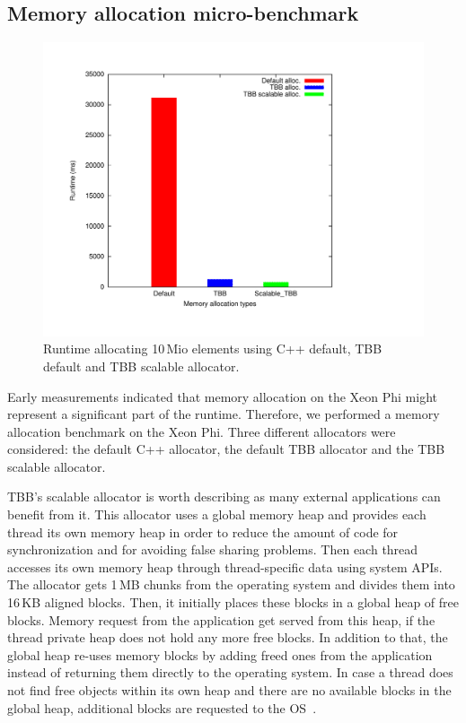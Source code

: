 \subsection{Memory allocation micro-benchmark}
\begin{figure}[t]
	\centering
	\includegraphics[scale=0.3]{../plots/mem_alloc/mem_alloc.pdf}
	\caption{Runtime allocating 10\,Mio elements using C++ default, TBB default and TBB scalable allocator.}
	\label{fig:mem_alloc}
\end{figure}

Early measurements indicated that memory allocation on the Xeon Phi might represent a significant part of the runtime.
Therefore, we performed a memory allocation benchmark on the Xeon Phi.
Three different allocators were considered: the default C++ allocator, the default TBB allocator and the TBB scalable allocator. 

TBB's scalable allocator is worth describing as many external applications can benefit from it. This allocator uses a global memory heap and provides each thread its own memory heap in order to reduce the amount of code for synchronization and for avoiding false sharing problems. Then each thread accesses its own memory heap through thread-specific data using system APIs. The allocator gets 1\,MB chunks from the operating system and divides them into 16\,KB aligned blocks. Then, it initially places these blocks in a global heap of free blocks. Memory request from the application get served from this heap, if the thread private heap does not hold any more free blocks. In addition to that, the global heap re-uses memory blocks by adding freed ones from the application instead of returning them directly to the operating system.
In case a thread does not find free objects within its own heap and there are no available blocks in the global heap, additional blocks are requested to the OS~\cite{_thefoundations,Hudson:2006:MST:1133956.1133967}. 

